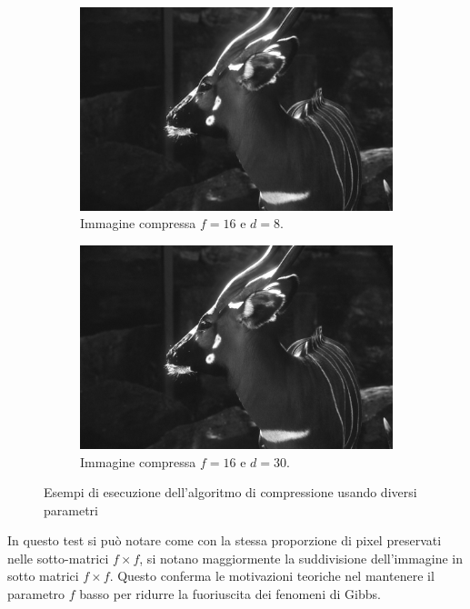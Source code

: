 \begin{figure}[!ht]
\begin{subfigure}[!ht]{0.45\textwidth}
        \includegraphics[width=\textwidth]{Progetto_2/img/f16d8.png}
        \caption{Immagine compressa $f = 16$ e $d = 8$.}
    \end{subfigure}
    \begin{subfigure}[!ht]{0.45\textwidth}
        \includegraphics[width=\textwidth]{Progetto_2/img/f16d30.png}
        \caption{Immagine compressa $f = 16$ e $d = 30$.}
    \end{subfigure}
    \caption{Esempi di esecuzione dell'algoritmo di compressione usando diversi 
    parametri}
    \label{fig:compress2}
\end{figure}

In questo test si può notare come con la stessa proporzione di 
pixel preservati nelle sotto-matrici $f\times f$, si notano maggiormente la suddivisione 
dell'immagine in sotto matrici $f\times f$. Questo conferma le motivazioni 
teoriche nel mantenere il parametro $f$ basso per ridurre la fuoriuscita dei 
fenomeni di Gibbs.